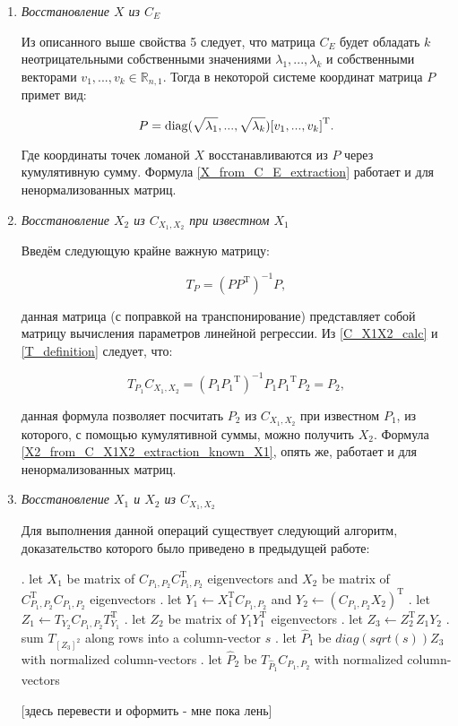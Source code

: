 \begin{enumerate}
\item \textit{Восстановление $X$ из $C_E$}

Из описанного выше свойства 5 следует, что матрица $C_E$ будет обладать $k$ неотрицательными собственными значениями $\lambda_1, ..., \lambda_k$ и собственными векторами $v_1, ..., v_k \in \mathbb{R}_{n,1}$. Тогда в некоторой системе координат матрица $P$ примет вид:

\begin{equation}
	P = \operatorname{diag}(\sqrt{\lambda_1}, ..., \sqrt{\lambda_k}){[v_1, ..., v_k]}^\mathrm{T}.
	\label{X_from_C_E_extraction}
\end{equation}

Где координаты точек ломаной $X$ восстанавливаются из $P$ через кумулятивную сумму. Формула \ref{X_from_C_E_extraction} работает и для ненормализованных матриц.

\item \textit{Восстановление $X_2$ из $C_{X_1, X_2}$ при известном $X_1$}

Введём следующую крайне важную матрицу:

\begin{equation}
	T_P = {(P{P}^\mathrm{T})}^{-1}P,
	\label{T_definition}
\end{equation}

данная матрица (с поправкой на транспонирование) представляет собой матрицу вычисления параметров линейной регрессии. Из \ref{C_X1X2_calc} и \ref{T_definition} следует, что:

\begin{equation}
	T_{P_1}C_{X_1, X_2} = {(P_1{P_1}^\mathrm{T})}^{-1}P_1{P_1}^\mathrm{T}{P_2} = P_2,
	\label{X2_from_C_X1X2_extraction_known_X1}
\end{equation}

данная формула позволяет посчитать $P_2$ из $C_{X_1, X_2}$ при известном $P_1$, из которого, с помощью кумулятивной суммы, можно получить $X_2$. Формула \ref{X2_from_C_X1X2_extraction_known_X1}, опять же, работает и для ненормализованных матриц.

\item \textit{Восстановление $X_1$ и $X_2$ из $C_{X_1, X_2}$}

Для выполнения данной операций существует следующий алгоритм, доказательство которого было приведено в предыдущей работе:

\begin{algorithmic}
. let \(X_1\) be matrix of \(C_{P_1,P_2}C^\mathrm{T}_{P_1,P_2}\) eigenvectors and \({X_2}\) be matrix of \(C^\mathrm{T}_{P_1,P_2}C_{P_1,P_2}\) eigenvectors
. let \(Y_1 \gets X^\mathrm{T}_1 C_{P_1,P_2}\) and \(Y_2 \gets (C_{P_1,P_2} X_2)^\mathrm{T}\)
. let \(Z_1 \gets T_{Y_2} C_{P_1,P_2} T^\mathrm{T}_{Y_1}\)
. let \(Z_2\) be matrix of \(Y_1 Y^\mathrm{T}_1\) eigenvectors
. let \(Z_3 \gets Z^\mathrm{T}_2 Z_1 Y_2\)
. sum \(T_{[Z_3]^2}\) along rows into a column-vector \(s\)
. let \(\hat{P}_1\) be \(diag(sqrt(s)) Z_3\) with normalized column-vectors
. let \(\hat{P}_2\) be \(T_{\hat{P}_1} C_{P_1,P_2}\) with normalized column-vectors
\end{algorithmic}

[здесь перевести и оформить - мне пока лень]

\end{enumerate}
 

